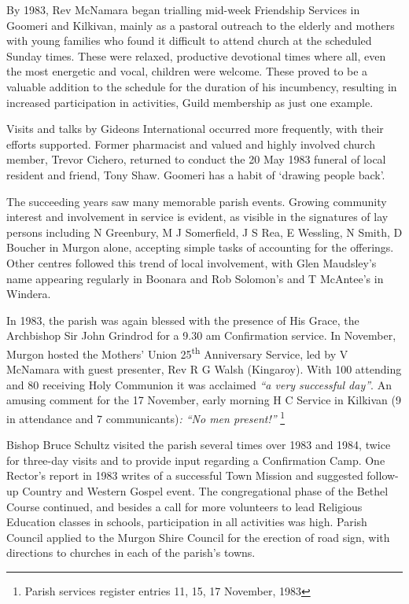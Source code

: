 By 1983, Rev McNamara began trialling mid-week Friendship Services in Goomeri and Kilkivan, mainly as a pastoral outreach to the elderly and mothers with young families who found it difficult to attend church at the scheduled Sunday times. These were relaxed, productive devotional times where all, even the most energetic and vocal, children were welcome. These proved to be a valuable addition to the schedule for the duration of his incumbency, resulting in increased participation in activities, Guild membership as just one example.

Visits and talks by Gideons International occurred more frequently, with their efforts supported. Former pharmacist and valued and highly involved church member, Trevor Cichero, returned to conduct the 20 May 1983 funeral of local resident and friend, Tony Shaw. Goomeri has a habit of `drawing people back'.

The succeeding years saw many memorable parish events. Growing community interest and involvement in service is evident, as visible in the signatures of lay persons including N Greenbury, M J Somerfield, J S Rea, E Wessling, N Smith, D Boucher in Murgon alone, accepting simple tasks of accounting for the offerings. Other centres followed this trend of local involvement, with Glen Maudsley's name appearing regularly in Boonara and Rob Solomon's and T McAntee's in Windera.

In 1983, the parish was again blessed with the presence of His Grace, the Archbishop Sir John Grindrod for a 9.30 am Confirmation service. In November, Murgon hosted the Mothers' Union 25\textsuperscript{th} Anniversary Service, led by V McNamara with guest presenter, Rev R G Walsh (Kingaroy). With 100 attending and 80 receiving Holy Communion it was acclaimed \emph{``a very successful day''}. An amusing comment for the 17 November, early morning H C Service in Kilkivan (9 in attendance and 7 communicants)\emph{: ``No men present!''} \footnote{Parish services register entries 11, 15, 17 November, 1983}

Bishop Bruce Schultz visited the parish several times over 1983 and 1984, twice for three-day visits and to provide input regarding a Confirmation Camp. One Rector's report in 1983 writes of a successful Town Mission and suggested follow-up Country and Western Gospel event. The congregational phase of the Bethel Course continued, and besides a call for more volunteers to lead Religious Education classes in schools, participation in all activities was high. Parish Council applied to the Murgon Shire Council for the erection of road sign, with directions to churches in each of the parish's towns.


